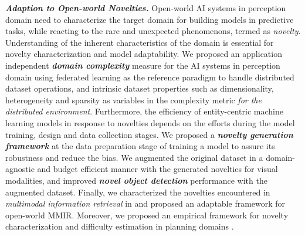 \documentclass[9pt]{article}
\makeatletter
\def \section {%
    \@startsection {section}
    {1}%
    {\z@}%
    {-3.3ex \@plus -1ex \@minus -.2ex}%
    {0.2em}
    {\normalfont \Large \scshape \bfseries} %
    }
\newcommand*\heading[1]{\large\textbf{\textit{#1.}}}
\makeatother
\begin{document}



\heading{Adaption to Open-world Novelties}
Open-world AI systems in perception domain need to characterize the target domain for building models in predictive tasks, while reacting to the rare and unexpected phenomenons, termed as \textit{novelty}. Understanding of the inherent characteristics of the domain is essential for novelty characterization and model adaptability. %
We proposed an application independent \textit{\textbf{domain complexity}} measure for the AI systems in perception domain \cite{solaiman2023domainComplexity} using federated learning as the reference paradigm to handle distributed dataset operations,
and intrinsic dataset properties such as dimensionality, heterogeneity and sparsity as variables in the complexity metric \textit{for the distributed environment}. 
%
%
Furthermore, the efficiency of entity-centric machine learning models in response to novelties depends on the efforts during the model training, design and data collection stages. We proposed a \textbf{\textit{novelty generation framework}} \cite{nesen2021dataset} at
the data preparation stage of training a model to assure its robustness and reduce the bias. We augmented the original dataset in a domain-agnostic
and budget efficient manner with the generated novelties for visual modalities, %
and improved \textbf{\textit{novel object detection}} performance with the augmented dataset.
Finally, we characterized the novelties encountered in \textit{multimodal information retrieval }in \cite{solaiman2022open} and proposed an adaptable framework for open-world MMIR.
Moreover, we proposed an empirical framework for novelty characterization and difficulty estimation in planning domains \cite{solaiman2022measurement}. 
\end{document}
